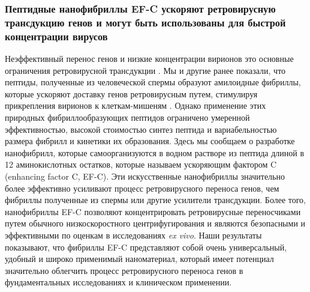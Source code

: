     
\subsubsection{Пептидные нанофибриллы EF-C ускоряют ретровирусную трансдукцию генов
и могут быть использованы для быстрой концентрации вирусов}
    
    Неэффективный перенос генов и низкие концентрации вирионов это основные ограничения ретровирусной трансдукции \cite{matrai_recent_2010}. Мы и другие ранее показали, что пептиды, полученные из человеческой спермы образуют амилоидные фибриллы, которые ускоряют доставку генов ретровирусным путем, стимулируя прикрепления вирионов к клеткам-мишеням \cite{munch_semen-derived_2007,roan_cationic_2009,kim_semen-mediated_2010,wurm_influence_2010,wurm_improved_2011,roan_peptides_2011,arnold_naturally_2012}. Однако применение этих природных фибриллообразующих пептидов ограничено умеренной эффективностью, высокой стоимостью синтез пептида и вариабельностью размера фибрилл и кинетики их образования. Здесь мы сообщаем о разработке нанофибрилл, которые самоорганизуются в водном растворе из пептида длиной в 12 аминокислотных остатков, которые называем ускоряющим фактором C (enhancing factor C, EF-C). Эти искусственные нанофибриллы значительно более эффективно усиливают процесс ретровирусного переноса генов, чем фибриллы полученные из спермы или другие усилители трансдукции. Более того, нанофибриллы EF-C позволяют концентрировать ретровирусные переносчиками путем обычного низкоскоростного центрифугирования и являются безопасными и эффективными по оценкам в исследованиях \textit{ex vivo}. Наши результаты показывают, что фибриллы EF-C представляют собой очень универсальный, удобный и широко применимый наноматериал, который имеет потенциал значительно облегчить процесс ретровирусного переноса генов в фундаментальных исследованиях и клиническом применении. 
    
